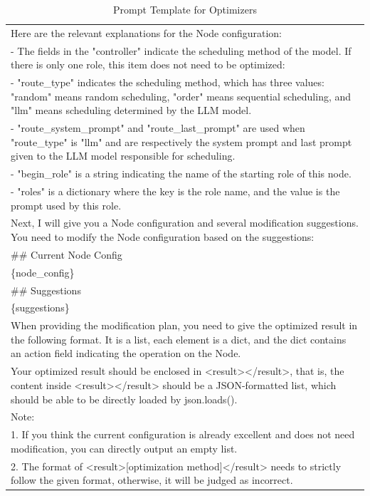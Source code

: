\documentclass{article}
\begin{document}
\begin{table}[htbp]
{\begin{tabular}{p{15cm}}
Here are the relevant explanations for the Node configuration:\\
- The fields in the "controller" indicate the scheduling method of the model. If there is only one role, this item does not need to be optimized:\\
  - "route\_type" indicates the scheduling method, which has three values: "random" means random scheduling, "order" means sequential scheduling, and "llm" means scheduling determined by the LLM model.\\
  - "route\_system\_prompt" and "route\_last\_prompt" are used when "route\_type" is "llm" and are respectively the system prompt and last prompt given to the LLM model responsible for scheduling.\\
- "begin\_role" is a string indicating the name of the starting role of this node.\\
- "roles" is a dictionary where the key is the role name, and the value is the prompt used by this role.\par\\

Next, I will give you a Node configuration and several modification suggestions. You need to modify the Node configuration based on the suggestions:\par\\

\#\# Current Node Config\\
\{node\_config\}\par\\

\#\# Suggestions\\
\{suggestions\}\par\\

When providing the modification plan, you need to give the optimized result in the following format. It is a list, each element is a dict, and the dict contains an action field indicating the operation on the Node.\par\\

Your optimized result should be enclosed in <result></result>, that is, the content inside <result></result> should be a JSON-formatted list, which should be able to be directly loaded by json.loads().\par\\

Note:\\
1. If you think the current configuration is already excellent and does not need modification, you can directly output an empty list.\\
2. The format of <result>[optimization method]</result> needs to strictly follow the given format, otherwise, it will be judged as incorrect.\\
    \bottomrule
    \end{tabular}
}
    \caption{Prompt Template for Optimizers}
    \vspace{-0.1in}
    \label{tab:prompt_optimizers}
\end{table}
\end{document}

